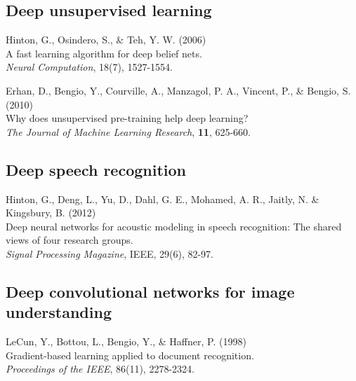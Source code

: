 \documentclass[]{article}
\begin{document}

\subsection{Deep unsupervised learning}
Hinton, G., Osindero, S., \& Teh, Y. W. (2006)\\ A fast learning algorithm
for deep belief nets.\\ {\it Neural Computation}, 18(7), 1527-1554.

Erhan, D., Bengio, Y., Courville, A., Manzagol, P. A., Vincent, P., \&
Bengio, S. (2010)\\ Why does unsupervised pre-training help deep
learning?\\ {\it The Journal of Machine Learning Research}, {\bf 11},
625-660.


\subsection{Deep speech recognition}


Hinton, G., Deng, L., Yu, D., Dahl, G. E., Mohamed, A. R., Jaitly, N. \&
Kingsbury, B. (2012)\\ Deep neural networks for acoustic modeling in speech
recognition: The shared views of four research groups.\\ {\it Signal
  Processing Magazine}, IEEE, 29(6), 82-97.


\subsection{Deep convolutional networks for image understanding}
LeCun, Y., Bottou, L., Bengio, Y., \& Haffner, P. (1998)\\ Gradient-based
learning applied to document recognition.\\ {\it Proceedings of the IEEE},
86(11), 2278-2324.
\end{document}
